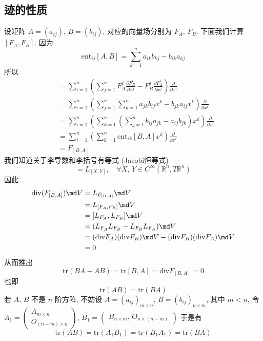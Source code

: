     \subsection{迹的性质}
    设矩阵 $A = (a_{ij}),\,B = (b_{ij})$, 对应的向量场分别为 $F_A,\,F_B$. 下面我们计算 $[F_A, F_B]$. 因为
    \begin{equation*}
        \mathrm{ent}_{ij}[A,B] = \sum_{k=1}^{n}a_{ik}b_{kj}-b_{ik}a_{kj}
    \end{equation*}
    所以
    \begin{align*}
        [F_A,F_B] &= \sum_{i=1}^{n}\left(\sum_{j=1}^{n}F_A^j\frac{\partial F_B^i}{\partial x^j}-F_B^j\frac{\partial F_A^i}{\partial x^j}\right)\frac{\partial}{\partial x^i} \\
        &= \sum_{i=1}^{n}\left(\sum_{j=1}^{n}\sum_{k=1}^{n}a_{jk}b_{ij}x^k-b_{jk}a_{ij}x^k\right)\frac{\partial}{\partial x^i} \\
        &= \sum_{i=1}^{n}\left(\sum_{k=1}^{n}\left(\sum_{j=1}^{n}b_{ij}a_{jk}-a_{ij}b_{jk}\right)x^k\right)\frac{\partial}{\partial x^i} \\
        &= \sum_{i=1}^{n}\left(\sum_{k=1}^{n}\mathrm{ent}_{ik}[B,A]x^k\right)\frac{\partial}{\partial x^i} \\
        &= F_{[B,A]}
    \end{align*}
    我们知道关于李导数和李括号有等式 (Jacobi恒等式)
    \begin{equation*}
        [L_X, L_Y] = L_{[X,Y]}, \quad\forall X,\,Y\in C^{\infty}(\mathbb{R}^n,T\mathbb{R}^n)
    \end{equation*}
    因此
    \begin{align*}
        \mathrm{div}(F_{[B,A]})\md V &= L_{F_{[B,A]}}\md V \\
        &= L_{[F_A,F_B]}\md V \\
        &= [L_{F_A},L_{F_B}]\md V \\
        &= (L_{F_A}L_{F_B}-L_{F_B}L_{F_A})\md V \\
        &= (\mathrm{div}F_A)(\mathrm{div}F_B)\md V - (\mathrm{div}F_B)(\mathrm{div}F_A)\md V \\
        &= 0
    \end{align*}
    从而推出
    \begin{equation*}
        \mathrm{tr}(BA-AB) = \mathrm{tr}[B,A] = \mathrm{div}F_{[B,A]} = 0
    \end{equation*}
    也即
    \begin{equation*}
        \mathrm{tr}(AB) = \mathrm{tr}(BA)
    \end{equation*}
    若 $A,\,B$ 不是 $n$ 阶方阵, 不妨设 $A = (a_{ij})_{m\times n},\,B = (b_{ij})_{n\times m}$, 其中 $m<n$,
    令 $A_1 = \begin{pmatrix}
        A_{m\times n} \\ O_{(n-m)\times n}
    \end{pmatrix},\,B_1 = \begin{pmatrix}
        B_{n\times m},\,O_{n\times(n-m)}
    \end{pmatrix}$
    于是有
    \begin{equation*}
        \mathrm{tr}(AB) = \mathrm{tr}(A_1B_1) = \mathrm{tr}(B_1A_1) = \mathrm{tr}(BA)
    \end{equation*}

